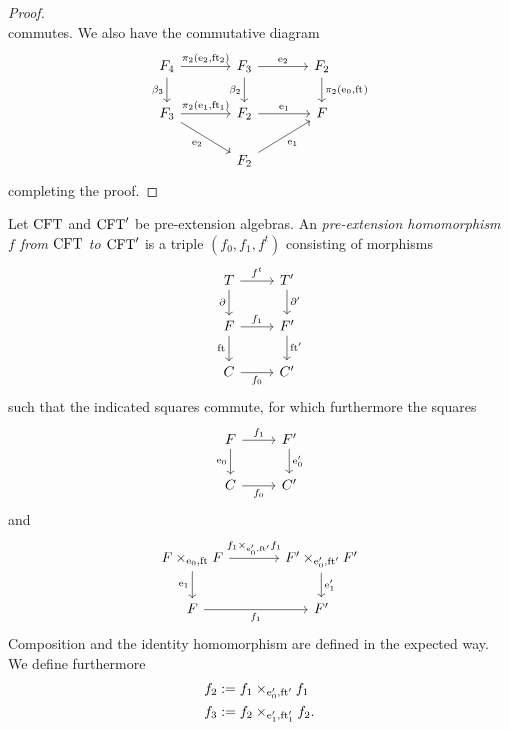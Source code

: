 \begin{proof}
\begin{equation*}
\end{equation*}
commutes. We also have the commutative diagram
\begin{equation*}
\begin{tikzcd}[column sep=large]
\stesysf_4
  \ar{r}{\pullbackpr{2}{\eext{2}}{\eft[2]}}
  \ar{d}[swap]{\beta_3}
  &
\stesysf_3
  \ar{r}{\eext{2}}
  \ar{d}[swap]{\beta_2}
  &
\stesysf_2
  \ar{d}{\pullbackpr{2}{\ectxext}{\eft}}
  \\
\stesysf_3
  \ar{r}{\pullbackpr{2}{\efamext}{\eft[1]}}
  \ar{dr}[swap]{\eext{2}}
  &
\stesysf_2
  \ar{r}{\efamext}
  &
\stesysf
  \\
  {} &
\stesysf_2
  \ar{ur}[swap]{\efamext}
\end{tikzcd}
\end{equation*}
completing the proof.
\end{proof}

\begin{defn}
Let $\mathrm{CFT}$ and $\mathrm{CFT}'$ be pre-extension algebras. An \emph{pre-extension homomorphism $f$ from 
$\mathrm{CFT}$ to $\mathrm{CFT}'$} is a triple $(f_0,f_1,f^t)$ consisting of morphisms
\begin{equation*}
\begin{tikzcd}
\stesyst 
  \ar{r}{f^t}
  \ar{d}[swap]{\ebd}
  &
\stesyst'
  \ar{d}{\ebd'}
  \\
\stesysf 
  \ar{r}{f_1}
  \ar{d}[swap]{\eft}
  &
\stesysf'
  \ar{d}{\eft'}
  \\
\stesysc 
  \ar{r}[swap]{f_0}
  &
\stesysc'
\end{tikzcd}
\end{equation*}
such that the indicated squares commute, for which furthermore the squares
\begin{equation*}
\begin{tikzcd}
\stesysf \ar{r}{f_1}
  \ar{d}[swap]{\ectxext}
  &
\stesysf'
  \ar{d}{\ectxext'}
  \\
\stesysc
  \ar{r}[swap]{f_0}
  &
\stesysc'
\end{tikzcd}
\end{equation*}
and
\begin{equation*}
\begin{tikzcd}[column sep=large]
\stesysf\times_{\ectxext,\eft} \stesysf
  \ar{r}{f_1\times_{\ectxext',\eft'} f_1}
  \ar{d}[swap]{\efamext}
  &
\stesysf'\times_{\ectxext',\eft'} \stesysf'
  \ar{d}{\efamext'}
  \\
\stesysf
  \ar{r}[swap]{f_1}
  &
\stesysf'
\end{tikzcd}
\end{equation*}
Composition and the identity homomorphism are defined in the expected way. We
define furthermore
\begin{align*}
f_2 & := \pullback{f_1}{f_1}{\ectxext'}{\eft'}
  \\
f_3 & := \pullback{f_2}{f_2}{\efamext'}{\eft[1]'}.
\end{align*}
\end{defn}

